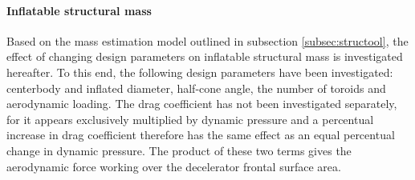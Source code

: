 \paragraph{Inflatable structural mass}

Based on the mass estimation model outlined in subsection \ref{subsec:structool}, the effect of changing design parameters on inflatable structural mass is investigated hereafter. To this end, the following design parameters have been investigated: centerbody and inflated diameter, half-cone angle, the number of toroids and aerodynamic loading. The drag coefficient has not been investigated separately, for it appears exclusively multiplied by dynamic pressure and a percentual increase in drag coefficient therefore has the same effect as an equal percentual change in dynamic pressure. The product of these two terms gives the aerodynamic force working over the decelerator frontal surface area.

